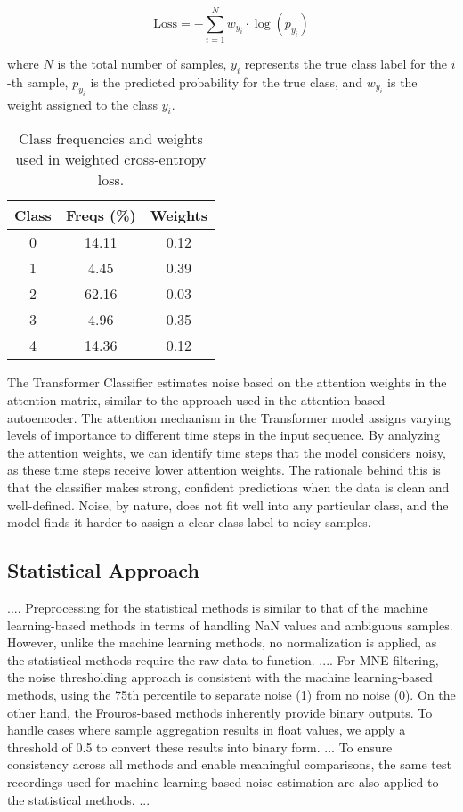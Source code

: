 \begin{equation}
    \text{Loss} = -\sum_{i=1}^{N} w_{y_i} \cdot \log(p_{y_i})
    \label{eq:weighted_cross_entropy_loss}
\end{equation}

where \(N\) is the total number of samples, \(y_i\) represents the true class label for the \(i\)-th sample, \(p_{y_i}\) is the predicted probability for the true class, and \(w_{y_i}\) is the weight assigned to the class \(y_i\).

\begin{table}[h!]
    \centering
    \begin{tabular}{c|c|c}
    Class & Freqs (\%) & Weights \\
    \hline
    0 & 14.11 & 0.12 \\
    1 & 4.45  & 0.39 \\
    2 & 62.16 & 0.03 \\
    3 & 4.96  & 0.35 \\
    4 & 14.36 & 0.12 \\
    \end{tabular}
    \caption{Class frequencies and weights used in weighted cross-entropy loss.}
    \label{tab:class_freqs_weights}
\end{table}

The Transformer Classifier estimates noise based on the attention weights in the attention matrix, similar to the approach used in the attention-based autoencoder. The attention mechanism in the Transformer model assigns varying levels of importance to different time steps in the input sequence. By analyzing the attention weights, we can identify time steps that the model considers noisy, as these time steps receive lower attention weights. The rationale behind this is that the classifier makes strong, confident predictions when the data is clean and well-defined. Noise, by nature, does not fit well into any particular class, and the model finds it harder to assign a clear class label to noisy samples.

\subsection{Statistical Approach}
....
Preprocessing for the statistical methods is similar to that of the machine learning-based methods in terms of handling NaN values and ambiguous samples. However, unlike the machine learning methods, no normalization is applied, as the statistical methods require the raw data to function.
....
For MNE filtering, the noise thresholding approach is consistent with the machine learning-based methods, using the 75th percentile to separate noise (1) from no noise (0). On the other hand, the Frouros-based methods inherently provide binary outputs. To handle cases where sample aggregation results in float values, we apply a threshold of 0.5 to convert these results into binary form.
...
To ensure consistency across all methods and enable meaningful comparisons, the same test recordings used for machine learning-based noise estimation are also applied to the statistical methods.
... 

